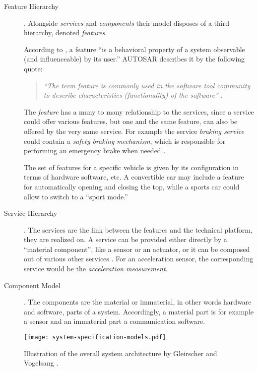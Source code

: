 \begin{description}
\item [Feature Hierarchy].
Alongside \emph{services} and \emph{components} their model disposes of a third hierarchy, denoted \emph{features}. 

According to \cite{gleirscher2014}, a feature ``is a behavioral property of a system observable (and influenceable) by its user.'' AUTOSAR describes it by the following quote:
\begin{quote}
\emph{``The term feature is commonly used in the software tool community to describe characteristics (functionality) of the software''} \cite{autosar_glossary}.
\end{quote}
The \emph{feature} has a many to many relationship to the services, since a service could offer various features, but one and the same feature, can also be offered by the very same service. For example the service \emph{braking service} could contain a \emph{safety braking mechanism}, which is responsible for performing an emergency brake when needed \cite{gleirscher2014}.

The set of features for a specific vehicle is given by its configuration in terms of hardware software, etc. A convertible car may include a feature for automatically opening and closing the top, while a sports car could allow to switch to a ``sport mode.''

\item [Service Hierarchy].
The services are the link between the features and the technical platform, they are realized on. A service can be provided either directly by a ``material component'', like a sensor or an actuator, or it can be composed out of various other services \cite{gleirscher2014}. For an acceleration sensor, the corresponding service would be the \emph{acceleration measurement}.

\item [Component Model].
The components are the material or immaterial, in other words hardware and software, parts of a system. Accordingly, a material part is for example a sensor and an immaterial part a communication software.
\end{description}

\begin{figure}[ht]
\centering
\texttt{[image: system-specification-models.pdf]}
\caption{Illustration of the overall system architecture by Gleirscher and Vogelsang \cite{gleirscher2014}.}
\label{fig:system-specification-models}
\end{figure}







